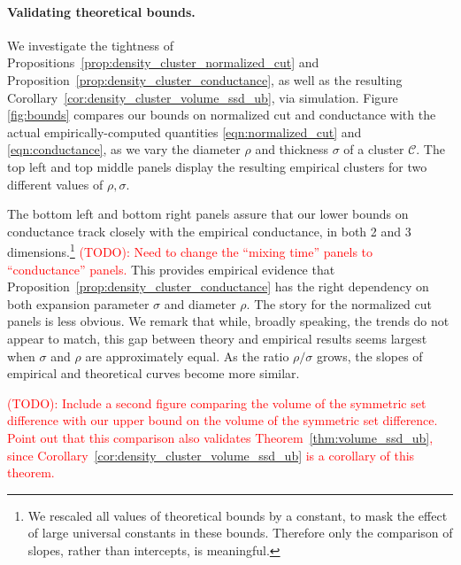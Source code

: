 \documentclass[11pt,twoside]{article}
\newcommand{\1}{\mathbf{1}}
\newcommand{\mc}[1]{\mathcal{#1}}
\begin{document}
\paragraph{Validating theoretical bounds.}  We investigate the tightness of
Propositions~\ref{prop:density_cluster_normalized_cut} and Proposition~\ref{prop:density_cluster_conductance}, as well as the resulting Corollary~\ref{cor:density_cluster_volume_ssd_ub}, via simulation. Figure \ref{fig:bounds} compares our bounds on normalized cut and conductance with the actual empirically-computed quantities \eqref{eqn:normalized_cut} and \eqref{eqn:conductance}, as we vary the diameter $\rho$ and thickness $\sigma$ of a cluster $\mc{C}$. The top left and top middle panels display the resulting empirical clusters for two different values of $\rho,\sigma$. 

The bottom left and bottom right panels assure that our lower bounds on conductance track closely with the empirical conductance, in both 2 and 3 
dimensions.\footnote{We rescaled all values of theoretical bounds by a constant, to mask the effect of large universal constants in these bounds. Therefore only the comparison of slopes, rather than intercepts, is meaningful.} \textcolor{red}{(TODO): Need to change the ``mixing time'' panels to ``conductance'' panels.} This provides empirical evidence that Proposition~\ref{prop:density_cluster_conductance} has the right dependency on both expansion parameter $\sigma$ and diameter $\rho$. The story for the normalized cut panels
is less obvious. We remark that while, broadly speaking, the trends do not
appear to match, this gap between theory and empirical results seems largest
when $\sigma $ and $\rho$ are approximately equal. As the ratio $\rho/\sigma$
grows, the slopes of empirical and theoretical curves become more similar.

\textcolor{red}{(TODO): Include a second figure comparing the volume of the symmetric set difference with our upper bound on the volume of the symmetric set difference. Point out that this comparison also validates Theorem~\ref{thm:volume_ssd_ub}, since Corollary~\ref{cor:density_cluster_volume_ssd_ub} is a corollary of this theorem.}
\end{document}
